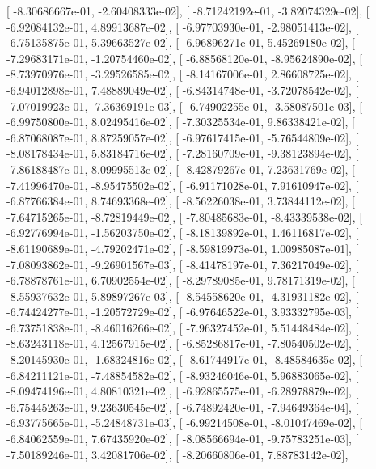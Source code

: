 \documentclass{article}
\begin{document}
       [ -8.30686667e-01,  -2.60408333e-02],
       [ -8.71242192e-01,  -3.82074329e-02],
       [ -6.92084132e-01,   4.89913687e-02],
       [ -6.97703930e-01,  -2.98051413e-02],
       [ -6.75135875e-01,   5.39663527e-02],
       [ -6.96896271e-01,   5.45269180e-02],
       [ -7.29683171e-01,  -1.20754460e-02],
       [ -6.88568120e-01,  -8.95624890e-02],
       [ -8.73970976e-01,  -3.29526585e-02],
       [ -8.14167006e-01,   2.86608725e-02],
       [ -6.94012898e-01,   7.48889049e-02],
       [ -6.84314748e-01,  -3.72078542e-02],
       [ -7.07019923e-01,  -7.36369191e-03],
       [ -6.74902255e-01,  -3.58087501e-03],
       [ -6.99750800e-01,   8.02495416e-02],
       [ -7.30325534e-01,   9.86338421e-02],
       [ -6.87068087e-01,   8.87259057e-02],
       [ -6.97617415e-01,  -5.76544809e-02],
       [ -8.08178434e-01,   5.83184716e-02],
       [ -7.28160709e-01,  -9.38123894e-02],
       [ -7.86188487e-01,   8.09995513e-02],
       [ -8.42879267e-01,   7.23631769e-02],
       [ -7.41996470e-01,  -8.95475502e-02],
       [ -6.91171028e-01,   7.91610947e-02],
       [ -6.87766384e-01,   8.74693368e-02],
       [ -8.56226038e-01,   3.73844112e-02],
       [ -7.64715265e-01,  -8.72819449e-02],
       [ -7.80485683e-01,  -8.43339538e-02],
       [ -6.92776994e-01,  -1.56203750e-02],
       [ -8.18139892e-01,   1.46116817e-02],
       [ -8.61190689e-01,  -4.79202471e-02],
       [ -8.59819973e-01,   1.00985087e-01],
       [ -7.08093862e-01,  -9.26901567e-03],
       [ -8.41478197e-01,   7.36217049e-02],
       [ -6.78878761e-01,   6.70902554e-02],
       [ -8.29789085e-01,   9.78171319e-02],
       [ -8.55937632e-01,   5.89897267e-03],
       [ -8.54558620e-01,  -4.31931182e-02],
       [ -6.74424277e-01,  -1.20572729e-02],
       [ -6.97646522e-01,   3.93332795e-03],
       [ -6.73751838e-01,  -8.46016266e-02],
       [ -7.96327452e-01,   5.51448484e-02],
       [ -8.63243118e-01,   4.12567915e-02],
       [ -6.85286817e-01,  -7.80540502e-02],
       [ -8.20145930e-01,  -1.68324816e-02],
       [ -8.61744917e-01,  -8.48584635e-02],
       [ -6.84211121e-01,  -7.48854582e-02],
       [ -8.93246046e-01,   5.96883065e-02],
       [ -8.09474196e-01,   4.80810321e-02],
       [ -6.92865575e-01,  -6.28978879e-02],
       [ -6.75445263e-01,   9.23630545e-02],
       [ -6.74892420e-01,  -7.94649364e-04],
       [ -6.93775665e-01,  -5.24848731e-03],
       [ -6.99214508e-01,  -8.01047469e-02],
       [ -6.84062559e-01,   7.67435920e-02],
       [ -8.08566694e-01,  -9.75783251e-03],
       [ -7.50189246e-01,   3.42081706e-02],
       [ -8.20660806e-01,   7.88783142e-02],
\end{document}
